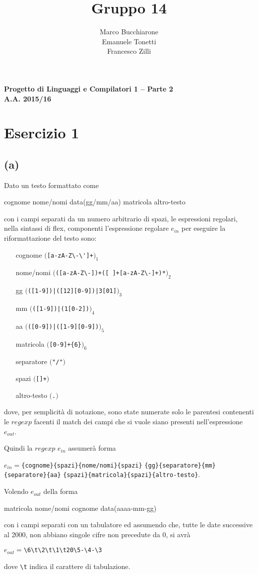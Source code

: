 \documentclass[a4paper,oneside,11pt]{article}
\makeatletter
\renewcommand\and{\\}
\renewcommand\maketitle{%
\bigskip\bigskip\bigskip\bigskip%
\begin{center}\bfseries\large%
Progetto di Linguaggi e Compilatori 1 -- Parte 2 \\ A.A. 2015/16\\%
\end{center}%
\bigskip%
\begin{center}\bfseries\LARGE \@title  \end{center}%
\bigskip%
\begin{center}\bfseries\large \@author \end{center}%
\bigskip\bigskip}
\makeatother
\begin{document}
\title{Gruppo 14}
\author{Marco Bucchiarone \and Emanuele Tonetti \and Francesco Zilli}
\maketitle
%
\section*{Esercizio 1}
\subsection*{(a)}
Dato un testo formattato come 
\begin{center}
cognome  nome/nomi  data(gg/mm/aa)  matricola  altro-testo
\end{center}
con i campi separati da un numero arbitrario di spazi, le espressioni regolari, nella sintassi di flex, componenti l'espressione regolare $e_{in}$ per eseguire la riformattazione del testo sono:
\begin{itemize}
	\item[cognome]		$($\Verb/[a-zA-Z\-\']+/$)_{1}$
	\item[nome/nomi]	$($\Verb/([a-zA-Z\-])+([ ]+[a-zA-Z\-]+)*/$)_{2}$
	\item[gg]		$($\Verb/([1-9])|([12][0-9])|3[01]/$)_{3}$ 
	\item[mm]		$($\Verb/([1-9])|(1[0-2])/$)_{4}$ 
	\item[aa]		$($\Verb/([0-9])|([1-9][0-9])/$)_{5}$ 
	\item[matricola]	$($\Verb/[0-9]+{6}/$)_{6}$ 
	\item[separatore]	$($\Verb!"/"!$)$ 
	\item[spazi]		$($\texttt{[\textvisiblespace]+}$)$
	\item[altro-testo]	$($\Verb/./$)$ 
\end{itemize}
dove, per semplicità di notazione, sono state numerate solo le parentesi contenenti le $regexp$ facenti il match dei campi che si vuole siano presenti nell'espressione $e_{out}$.
\newpage
\par
Quindi la $regexp$ $e_{in}$ assumerà forma
\begin{center}
$e_{in} =$\Verb!{cognome}!\Verb!{spazi}!\Verb!{nome/nomi}!\Verb!{spazi}!
\Verb!{gg}!\Verb!{separatore}!\Verb!{mm}!\Verb!{separatore}!\Verb!{aa}!
\Verb!{spazi}!\Verb!{!\Verb!matricola}!\Verb!{spazi}!\Verb!{altro-testo}!.
\end{center}
\par
Volendo $e_{out}$ della forma
\begin{center}
	matricola nome/nomi cognome data(aaaa-mm-gg)
\end{center}
con i campi separati con un tabulatore ed assumendo che, tutte le date successive al 2000, non abbiano singole cifre non precedute da 0, si avrà
\begin{center}
	$e_{out}=$\Verb!\6\t\2\t\1\t20\5-\4-\3!
\end{center}
dove \Verb!\t! indica il carattere di tabulazione.
\end{document}
